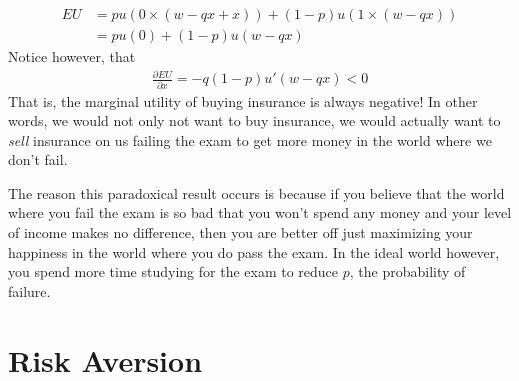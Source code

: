 \begin{align*}
    EU &= p u(0 \times (w - qx + x)) + (1 - p) u(1 \times (w - qx)) \\
    &= p u(0) + (1 - p) u(w - qx)
\end{align*}
Notice however, that
\begin{align*}
    \frac{\partial EU}{\partial x} = - q(1 - p) u'(w - qx) < 0
\end{align*}
That is, the marginal utility of buying insurance is always negative! In other words, we would not only not want to buy insurance, we would actually want to \emph{sell} insurance on us failing the exam to get more money in the world where we don't fail. 

The reason this paradoxical result occurs is because if you believe that the world where you fail the exam is so bad that you won't spend any money and your level of income makes no difference, then you are better off just maximizing your happiness in the world where you do pass the exam. In the ideal world however, you spend more time studying for the exam to reduce $p$, the probability of failure. 

\section{Risk Aversion} \label{sec:risk_aversion}
